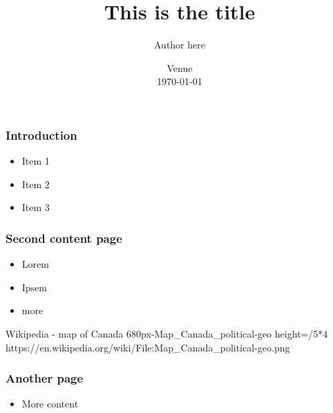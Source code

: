 \documentclass[11pt,aspectratio=169]{beamer}
\title{This is the title}
\author{Author here}
\institute 
{
  Title\\
  Division/Sector\\
  Natural Resources Canada
}
\date{Venue\\
     \today}
\begin{document}
\nrcanTitleframe

  
\begin{nrcanFrame}
  \frametitle{Introduction}
  \begin{itemize}
  \item Item 1
  \item Item 2
  \item Item 3
  \end{itemize}
\end{nrcanFrame}

\begin{nrcanFrame}
  \frametitle{Second content page}
  \begin{itemize}
  \item Lorem
  \item Ipsem
  \item more
  \end{itemize}
\end{nrcanFrame}


\begin{nrcanGraphicFrame}
  {Wikipedia - map of Canada}
  {680px-Map_Canada_political-geo}
  {height=\paperheight/5*4}
  {https://en.wikipedia.org/wiki/File:Map_Canada_political-geo.png}
\end{nrcanGraphicFrame}


\begin{nrcanFrame}
  \frametitle{Another page}
  \begin{itemize}
  \item More content
  \end{itemize}
\end{nrcanFrame}


\begin{nrcanLastFrame}

\end{nrcanLastFrame}
\end{document}
